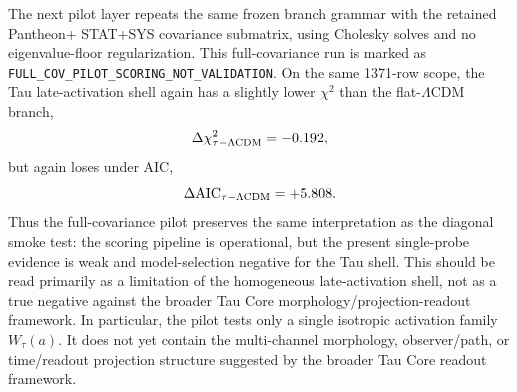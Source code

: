 \documentclass[11pt]{article}
\begin{document}
The next pilot layer repeats the same frozen branch grammar with the retained
Pantheon+ STAT+SYS covariance submatrix, using Cholesky solves and no
eigenvalue-floor regularization. This full-covariance run is marked as
\texttt{FULL\_\allowbreak{}COV\_\allowbreak{}PILOT\_\allowbreak{}SCORING\_\allowbreak{}NOT\_\allowbreak{}VALIDATION}. On the same 1371-row
scope, the Tau late-activation shell again has a slightly lower
\(\chi^2\) than the flat-\(\Lambda\)CDM branch,
\[
\Delta\chi^2_{\tau-\Lambda{\rm CDM}}=-0.192,
\]
but again loses under AIC,
\[
\Delta{\rm AIC}_{\tau-\Lambda{\rm CDM}}=+5.808.
\]
Thus the full-covariance pilot preserves the same interpretation as the
diagonal smoke test: the scoring pipeline is operational, but the present
single-probe evidence is weak and model-selection negative for the Tau shell.
This should be read primarily as a limitation of the homogeneous late-activation
shell, not as a true negative against the broader Tau Core
morphology/projection-readout framework. In particular, the pilot tests only a
single isotropic activation family \(W_\tau(a)\). It does not yet contain the
multi-channel morphology, observer/path, or time/readout projection structure
suggested by the broader Tau Core readout framework.
\end{document}
